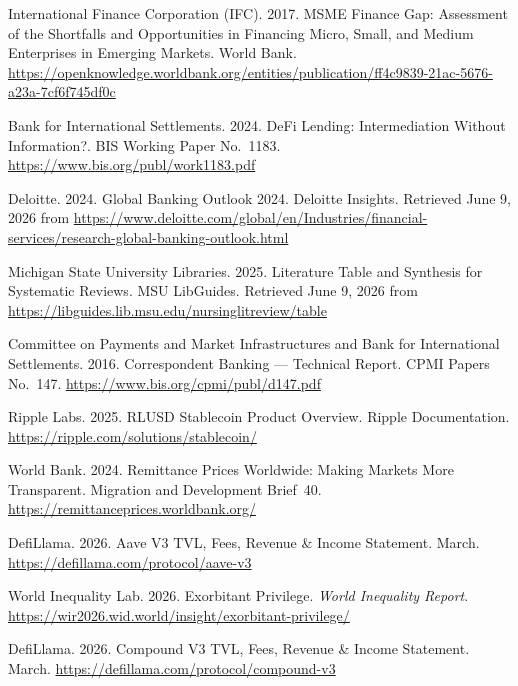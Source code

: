 \documentclass[12pt,a4paper]{report}
\begin{document}
{\begin{enumerate}[label={[\arabic*]}]
\item International Finance Corporation (IFC). 2017. MSME Finance Gap: Assessment of the Shortfalls and Opportunities in Financing Micro, Small, and Medium Enterprises in Emerging Markets. World Bank. \url{https://openknowledge.worldbank.org/entities/publication/ff4c9839-21ac-5676-a23a-7cf6f745df0c}

\item Bank for International Settlements. 2024. DeFi Lending: Intermediation Without Information?. BIS Working Paper No.~1183. \url{https://www.bis.org/publ/work1183.pdf}

\item Deloitte. 2024. Global Banking Outlook 2024. Deloitte Insights. Retrieved June 9, 2026 from \url{https://www.deloitte.com/global/en/Industries/financial-services/research-global-banking-outlook.html}

\item Michigan State University Libraries. 2025. Literature Table and Synthesis for Systematic Reviews. MSU LibGuides. Retrieved June 9, 2026 from \url{https://libguides.lib.msu.edu/nursinglitreview/table}

\item Committee on Payments and Market Infrastructures and Bank for International Settlements. 2016. Correspondent Banking --- Technical Report. CPMI Papers No.~147. \url{https://www.bis.org/cpmi/publ/d147.pdf}

\item Ripple Labs. 2025. RLUSD Stablecoin Product Overview. Ripple Documentation. \url{https://ripple.com/solutions/stablecoin/}

\item World Bank. 2024. Remittance Prices Worldwide: Making Markets More Transparent. Migration and Development Brief~40. \url{https://remittanceprices.worldbank.org/}

\item DefiLlama. 2026. Aave V3 TVL, Fees, Revenue \& Income Statement. March. \url{https://defillama.com/protocol/aave-v3}

\item World Inequality Lab. 2026. Exorbitant Privilege. \emph{World Inequality Report}. \url{https://wir2026.wid.world/insight/exorbitant-privilege/}

\item DefiLlama. 2026. Compound V3 TVL, Fees, Revenue \& Income Statement. March. \url{https://defillama.com/protocol/compound-v3}


\end{enumerate}}
\end{document}
